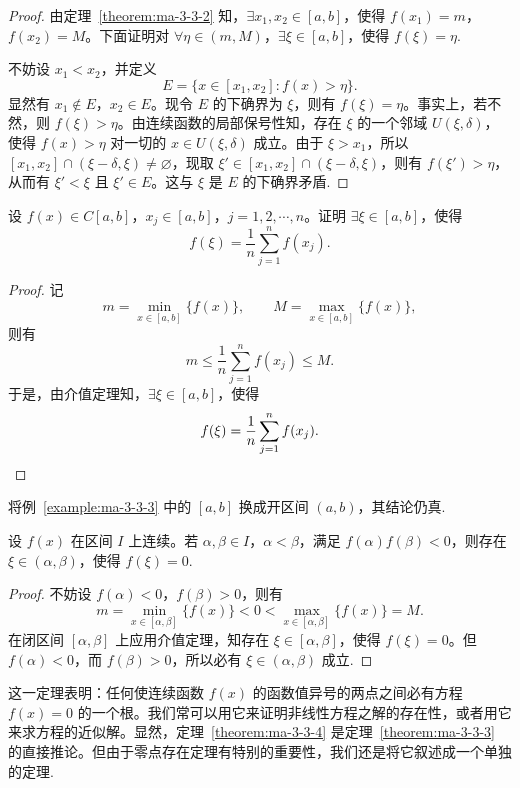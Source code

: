 \begin{proof}
由定理~\ref{theorem:ma-3-3-2} 知，$\exists x_1,x_2\in[a,b]$，使得 $f(x_1)=m$，$f(x_2)=M$。下面证明对 $\forall\eta\in(m,M)$，$\exists\xi\in[a,b]$，使得 $f(\xi)=\eta$.

不妨设 $x_1<x_2$，并定义
\[
  E=\{x\in[x_1,x_2]:f(x)>\eta\}.
\]
显然有 $x_1\notin E$，$x_2\in E$。现令 $E$ 的下确界为 $\xi$，则有 $f(\xi)=\eta$。事实上，若不然，则 $f(\xi)>\eta$。由连续函数的局部保号性知，存在 $\xi$ 的一个邻域 $U(\xi,\delta)$，使得 $f(x)>\eta$ 对一切的 $x\in U(\xi,\delta)$ 成立。由于 $\xi>x_1$，所以 $[x_1,x_2]\cap(\xi-\delta,\xi)\ne\varnothing$，现取 $\xi'\in[x_1,x_2]\cap(\xi-\delta,\xi)$，则有 $f(\xi')>\eta$，从而有 $\xi'<\xi$ 且 $\xi'\in E$。这与 $\xi$ 是 $E$ 的下确界矛盾.
\end{proof}


\begin{example}\label{example:ma-3-3-3}
设 $f(x)\in C[a,b]$，$x_j\in[a,b]$，$j=1,2,\cdots,n$。证明 $\exists\xi\in[a,b]$，使得
\[
  f(\xi)=\frac1n\sum_{j=1}^{n}f(x_j).
\]
\end{example}


\begin{proof}
记
\[
  m=\min_{x\in[a,b]}\{f(x)\},\qquad
  M=\max_{x\in[a,b]}\{f(x)\},
\]
则有
\[
  m\leqslant\frac1n\sum_{j=1}^{n}f(x_j)\leqslant M.
\]
于是，由介值定理知，$\exists\xi\in[a,b]$，使得
\[
  f(\xi)=\frac1n\sum_{j=1}^{n}f(x_j).
\qedhere
\]
\end{proof}


\begin{remark}\label{remark:ma-3-source-99}
将例~\ref{example:ma-3-3-3} 中的 $[a,b]$ 换成开区间 $(a,b)$，其结论仍真.
\end{remark}


\begin{theorem}[{零点存在定理}]\label{theorem:ma-3-3-4}
设 $f(x)$ 在区间 $I$ 上连续。若 $\alpha,\beta\in I$，$\alpha<\beta$，满足 $f(\alpha)f(\beta)<0$，则存在 $\xi\in(\alpha,\beta)$，使得 $f(\xi)=0$.
\end{theorem}


\begin{proof}
不妨设 $f(\alpha)<0$，$f(\beta)>0$，则有
\[
  m=\min_{x\in[\alpha,\beta]}\{f(x)\}<0<\max_{x\in[\alpha,\beta]}\{f(x)\}=M.
\]
在闭区间 $[\alpha,\beta]$ 上应用介值定理，知存在 $\xi\in[\alpha,\beta]$，使得 $f(\xi)=0$。但 $f(\alpha)<0$，而 $f(\beta)>0$，所以必有 $\xi\in(\alpha,\beta)$ 成立.
\end{proof}


\begin{remark}\label{remark:ma-3-source-102}
这一定理表明：任何使连续函数 $f(x)$ 的函数值异号的两点之间必有方程 $f(x)=0$ 的一个根。我们常可以用它来证明非线性方程之解的存在性，或者用它来求方程的近似解。显然，定理~\ref{theorem:ma-3-3-4} 是定理~\ref{theorem:ma-3-3-3} 的直接推论。但由于零点存在定理有特别的重要性，我们还是将它叙述成一个单独的定理.
\end{remark}


